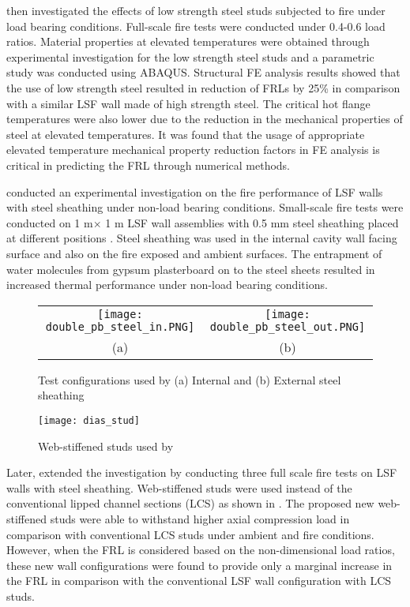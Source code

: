\citet{Ariyanayagam2018c} then investigated the effects of low strength steel studs subjected to fire under load bearing conditions. Full-scale fire tests were conducted under 0.4-0.6 load ratios. Material properties at elevated temperatures were obtained through experimental investigation for the low strength steel studs and a parametric study was conducted using ABAQUS. Structural FE analysis results showed that the use of low strength steel resulted in reduction of FRLs by 25\% in comparison with a similar LSF wall made of high strength steel. The critical hot flange temperatures were also lower due to the reduction in the mechanical properties of steel at elevated temperatures. It was found that the usage of appropriate elevated temperature mechanical property reduction factors in FE analysis is critical in predicting the FRL through numerical methods. 

\citet{Dias2018a} conducted an experimental investigation on the fire performance of LSF walls with steel sheathing under non-load bearing conditions. Small-scale fire tests were conducted on 1 m$\times$ 1 m LSF wall assemblies with 0.5 mm steel sheathing placed at different positions . Steel sheathing was used in the internal cavity wall facing surface and also on the fire exposed and ambient surfaces. The entrapment of water molecules from gypsum plasterboard on to the steel sheets resulted in increased thermal performance under non-load bearing conditions.   
\begin{figure}
	\centering
		\begin{tabular}{cc}
			\texttt{[image: double\_pb\_steel\_in.PNG]} &	
			\texttt{[image: double\_pb\_steel\_out.PNG]} \\
			(a) & (b) \\
		\end{tabular}
	\caption{Test configurations used by \citet{Dias2019c} (a) Internal and (b) External steel sheathing}
	\label{fig:dias_configuration}
\end{figure}
\begin{figure}[!htbp]
	\centering
		\texttt{[image: dias\_stud]}		
		\caption{Web-stiffened studs used by \citet{Dias2019c}}
		\label{fig:dias_stud}
\end{figure}

Later, \citet{Dias2019c} extended the investigation by conducting three full scale fire tests on LSF walls with steel sheathing. Web-stiffened studs were used instead of the conventional lipped channel sections (LCS) as shown in . The proposed new web-stiffened studs were able to withstand higher axial compression load in comparison with conventional LCS studs under ambient and fire conditions. However, when the FRL is considered based on the non-dimensional load ratios, these new wall configurations were found to provide only a marginal increase in the FRL in comparison with the conventional LSF wall configuration with LCS studs. 

